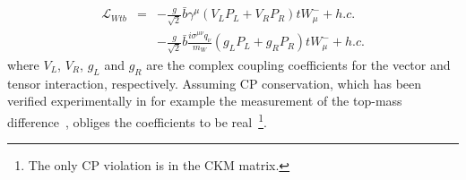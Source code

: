 \begin{eqnarray} \label{eq::FullWtbLagr}
  \mathcal{L}_{Wtb} & = & - \frac{g}{\sqrt{2}} \bar{b} \gamma^{\mu} \left( V_L P_L + V_R P_R \right) t W_{\mu}^{-} + h.c. \nonumber \\
		    &   & - \frac{g}{\sqrt{2}} \bar{b} \frac{i\sigma^{\mu \nu} q_{\nu}}{m_{W}} \left( g_L P_L + g_R P_R \right) t W_{\mu}^{-} + h.c.
\end{eqnarray}
where $V_L$, $V_R$, $g_L$ and $g_R$ are the complex coupling coefficients for the vector and tensor interaction, respectively. Assuming CP conservation, which has been verified experimentally in for example the measurement of the top-mass difference~\cite{}, obliges the coefficients to be real~\footnote{The only CP violation is in the CKM matrix.}.
\\

